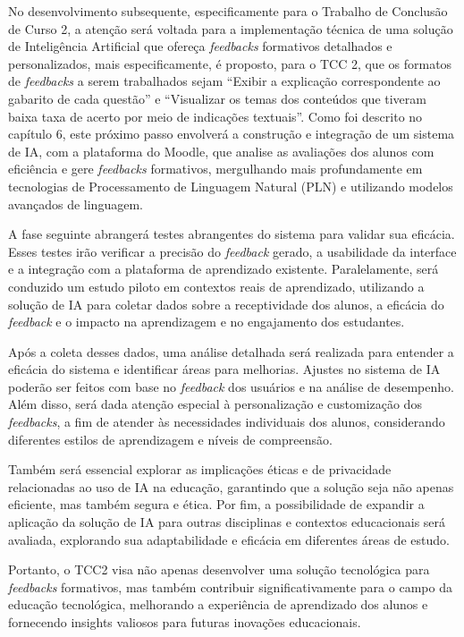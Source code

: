 No desenvolvimento subsequente, especificamente para o Trabalho de Conclusão de Curso 2, a atenção será voltada para a implementação técnica de uma solução de Inteligência Artificial que ofereça \textit{feedbacks} formativos detalhados e personalizados, mais especificamente, é proposto, para o TCC 2, que os formatos de \textit{feedbacks} a serem trabalhados sejam ``Exibir a explicação correspondente ao gabarito de cada questão'' e ``Visualizar os temas dos conteúdos que tiveram baixa taxa de acerto por meio de indicações textuais''. Como foi descrito no capítulo 6, este próximo passo envolverá a construção e integração de um sistema de IA, com a plataforma do Moodle, que analise as avaliações dos alunos com eficiência e gere \textit{feedbacks} formativos, mergulhando mais profundamente em tecnologias de Processamento de Linguagem Natural (PLN) e utilizando modelos avançados de linguagem.

A fase seguinte abrangerá testes abrangentes do sistema para validar sua eficácia. Esses testes irão verificar a precisão do \textit{feedback} gerado, a usabilidade da interface e a integração com a plataforma de aprendizado existente. Paralelamente, será conduzido um estudo piloto em contextos reais de aprendizado, utilizando a solução de IA para coletar dados sobre a receptividade dos alunos, a eficácia do \textit{feedback} e o impacto na aprendizagem e no engajamento dos estudantes.

Após a coleta desses dados, uma análise detalhada será realizada para entender a eficácia do sistema e identificar áreas para melhorias. Ajustes no sistema de IA poderão ser feitos com base no \textit{feedback} dos usuários e na análise de desempenho. Além disso, será dada atenção especial à personalização e customização dos \textit{feedbacks}, a fim de atender às necessidades individuais dos alunos, considerando diferentes estilos de aprendizagem e níveis de compreensão.

Também será essencial explorar as implicações éticas e de privacidade relacionadas ao uso de IA na educação, garantindo que a solução seja não apenas eficiente, mas também segura e ética. Por fim, a possibilidade de expandir a aplicação da solução de IA para outras disciplinas e contextos educacionais será avaliada, explorando sua adaptabilidade e eficácia em diferentes áreas de estudo.

Portanto, o TCC2 visa não apenas desenvolver uma solução tecnológica para \textit{feedbacks} formativos, mas também contribuir significativamente para o campo da educação tecnológica, melhorando a experiência de aprendizado dos alunos e fornecendo insights valiosos para futuras inovações educacionais.

